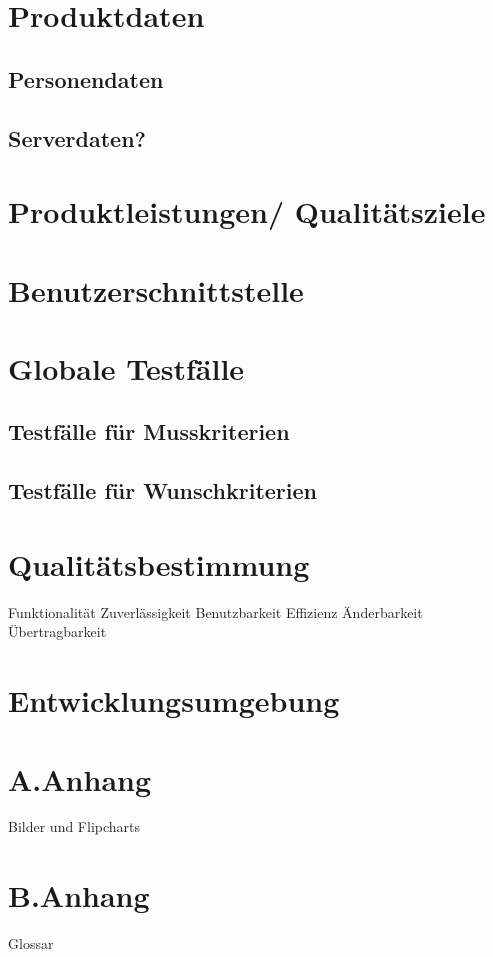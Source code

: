 \documentclass[parskip=full]{scrartcl}
\begin{document}
\section{Produktdaten}
\subsection{Personendaten}
\subsection{Serverdaten?}

\section{Produktleistungen/ Qualitätsziele}

\section{Benutzerschnittstelle}

\section{Globale Testfälle}
\subsection{Testfälle für Musskriterien}
\subsection{Testfälle für Wunschkriterien}

\section{Qualitätsbestimmung}
Funktionalität 
Zuverlässigkeit
Benutzbarkeit 
Effizienz 
Änderbarkeit 
Übertragbarkeit

\section{Entwicklungsumgebung}

\section{A.Anhang}
Bilder und Flipcharts

\section{B.Anhang}
Glossar
\end{document}
